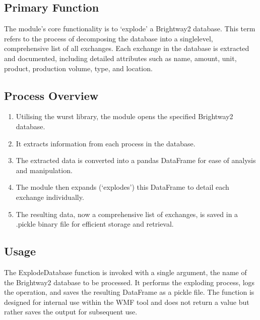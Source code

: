 \documentclass[letterpaper,10pt,english]{sphinxmanual}
\begin{document}
\subsection{Primary Function}
\label{\detokenize{ExplodeDatabase:primary-function}}
\sphinxAtStartPar
The module’s core functionality is to ‘explode’ a Brightway2 database. This term refers to the process of decomposing
the database into a single\sphinxhyphen{}level, comprehensive list of all exchanges. Each exchange in the database is extracted and
documented, including detailed attributes such as name, amount, unit, product, production volume, type, and location.


\subsection{Process Overview}
\label{\detokenize{ExplodeDatabase:process-overview}}\begin{enumerate}
%
\item {} 
\sphinxAtStartPar
Utilising the wurst library, the module opens the specified Brightway2 database.

\item {} 
\sphinxAtStartPar
It extracts information from each process in the database.

\item {} 
\sphinxAtStartPar
The extracted data is converted into a pandas DataFrame for ease of analysis and manipulation.

\item {} 
\sphinxAtStartPar
The module then expands (‘explodes’) this DataFrame to detail each exchange individually.

\item {} 
\sphinxAtStartPar
The resulting data, now a comprehensive list of exchanges, is saved in a .pickle binary file for efficient storage
and retrieval.

\end{enumerate}


\subsection{Usage}
\label{\detokenize{ExplodeDatabase:usage}}
\sphinxAtStartPar
The ExplodeDatabase function is invoked with a single argument, the name of the Brightway2 database to be processed.
It performs the exploding process, logs the operation, and saves the resulting DataFrame as a pickle file. The function
is designed for internal use within the WMF tool and does not return a value but rather saves the output for subsequent
use.
\end{document}
